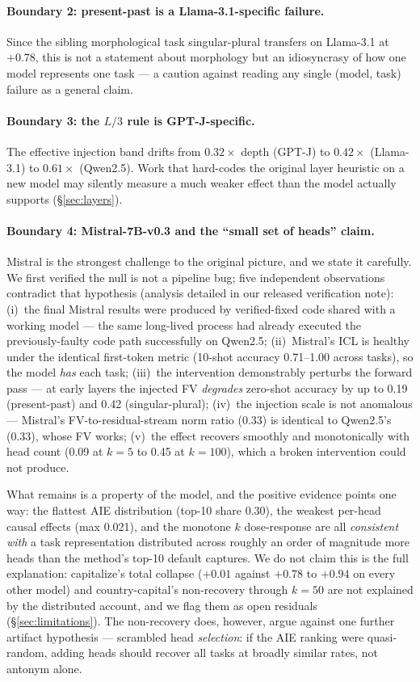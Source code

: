 \documentclass[11pt]{article}
\begin{document}
\paragraph{Boundary 2: present-past is a Llama-3.1-specific failure.}
Since the sibling morphological task singular-plural transfers on
Llama-3.1 at $+0.78$, this is not a statement about morphology but an
idiosyncrasy of how one model represents one task --- a caution against
reading any single (model, task) failure as a general claim.

\paragraph{Boundary 3: the $L/3$ rule is GPT-J-specific.} The effective
injection band drifts from $0.32\times$ depth (GPT-J) to $0.42\times$
(Llama-3.1) to $0.61\times$ (Qwen2.5). Work that hard-codes the original
layer heuristic on a new model may silently measure a much weaker effect
than the model actually supports (\S\ref{sec:layers}).

\paragraph{Boundary 4: Mistral-7B-v0.3 and the ``small set of heads''
claim.} Mistral is the strongest challenge to the original picture, and we
state it carefully. We first verified the null is not a pipeline bug; five
independent observations contradict that hypothesis
(analysis detailed in our released verification note):
(i)~the final Mistral results were produced by verified-fixed code shared
with a working model --- the same long-lived process had already executed
the previously-faulty code path successfully on Qwen2.5; (ii)~Mistral's
ICL is healthy under the identical first-token metric (10-shot accuracy
0.71--1.00 across tasks), so the model \emph{has} each task; (iii)~the
intervention demonstrably perturbs the forward pass --- at early layers
the injected FV \emph{degrades} zero-shot accuracy by up to 0.19
(present-past) and 0.42 (singular-plural); (iv)~the injection scale is not
anomalous --- Mistral's FV-to-residual-stream norm ratio (0.33) is
identical to Qwen2.5's (0.33), whose FV works; (v)~the effect recovers
smoothly and monotonically with head count (0.09 at $k{=}5$ to 0.45 at
$k{=}100$), which a broken intervention could not produce.

What remains is a property of the model, and the positive evidence points
one way: the flattest AIE distribution (top-10 share 0.30), the weakest
per-head causal effects (max 0.021), and the monotone $k$ dose-response
are all \emph{consistent with} a task representation distributed across
roughly an order of magnitude more heads than the method's top-10 default
captures. We do not claim this is the full explanation: capitalize's total
collapse ($+0.01$ against $+0.78$ to $+0.94$ on every other model) and
country-capital's non-recovery through $k{=}50$ are not explained by the
distributed account, and we flag them as open residuals
(\S\ref{sec:limitations}). The non-recovery does, however, argue against
one further artifact hypothesis --- scrambled head \emph{selection}: if
the AIE ranking were quasi-random, adding heads should recover all tasks
at broadly similar rates, not antonym alone.
\end{document}
